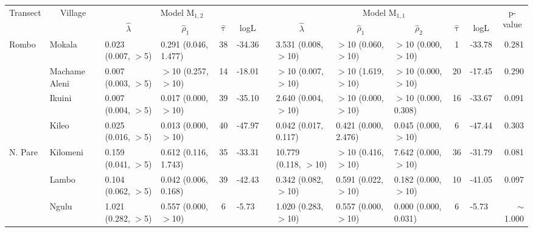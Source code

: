 \begin{tabular}{llllclllllclr} 
\toprule
\multicolumn{1}{c}{\multirow{2}{*}{Transect}} & \multicolumn{1}{c}{\multirow{2}{*}{Village}} & \multicolumn{4}{c}{Model M$_{1,2}$} & \multicolumn{1}{c}{} & \multicolumn{5}{c}{Model M$_{1,1}$} & \multicolumn{1}{c}{\multirow{2}{*}{p-value}}  \\ 
\cmidrule{3-6}\cmidrule{8-12}
\multicolumn{1}{c}{} & \multicolumn{1}{c}{} & \multicolumn{1}{c}{$\hat{\lambda}$} & \multicolumn{1}{c}{$\hat{\rho}_1$} & \multicolumn{1}{c}{$\hat{\uptau}$} & \multicolumn{1}{c}{logL} & \multicolumn{1}{c}{} & \multicolumn{1}{c}{$\hat{\lambda}$} & \multicolumn{1}{c}{$\hat{\rho}_1$} & \multicolumn{1}{c}{$\hat{\rho}_2$} & \multicolumn{1}{c}{$\hat{\uptau}$} & \multicolumn{1}{c}{logL} & \multicolumn{1}{c}{} \\ 
\midrule
Rombo       & Mokala         & 0.023 (0.007, $>$5)    & 0.291 (0.046, 1.477)   & 38   & -34.36   & & 3.531 (0.008, $>$10)   & $>$10 (0.060, $>$10)   & $>$10 (0.000, $>$10)   & 1    & -33.78   & 0.281\\
            & Machame Aleni  & 0.007 (0.003, $>$5)    & $>$10 (0.257, $>$10)   & 14   & -18.01   & & $>$10 (0.007, $>$10)   & $>$10 (1.619, $>$10)   & $>$10 (0.000, $>$10)   & 20   & -17.45   & 0.290\\
            & Ikuini         & 0.007 (0.004, $>$5)    & 0.017 (0.000, $>$10)   & 39   & -35.10   & & 2.640 (0.004, $>$10)   & $>$10 (0.000, $>$10)   & $>$10 (0.000, 0.308)  & 16   & -33.67   & 0.091\\
            & Kileo          & 0.025 (0.016, $>$5)    & 0.013 (0.000, $>$10)   & 40   & -47.97   & & 0.042 (0.017, 0.117)   & 0.421 (0.000, 2.476)   & 0.045 (0.000, $>$10)   & 6    & -47.44   & 0.303\\
\cmidrule{2-13}
N. Pare     & Kilomeni       & 0.159 (0.041, $>$5)    & 0.612 (0.116, 1.743)   & 35   & -33.31   & & 10.779 (0.118, $>$10)  & $>$10 (0.416, $>$10)   & 7.642 (0.000, $>$10)   & 36   & -31.79   & 0.081\\
            & Lambo          & 0.104 (0.062, $>$5)    & 0.042 (0.006, 0.168)   & 39   & -42.43   & & 0.342 (0.082, $>$10)   & 0.591 (0.022, $>$10)   & 0.182 (0.000, $>$10)   & 10   & -41.05   & 0.097\\
            & Ngulu          & 1.021 (0.282, $>$5)    & 0.557 (0.000, $>$10)   & 6    & -5.73    & & 1.020 (0.283, $>$10)   & 0.557 (0.000, $>$10)   & 0.000 (0.000, 0.031)  & 6    & -5.73    & $\sim$1.000\\

\end{tabular}

